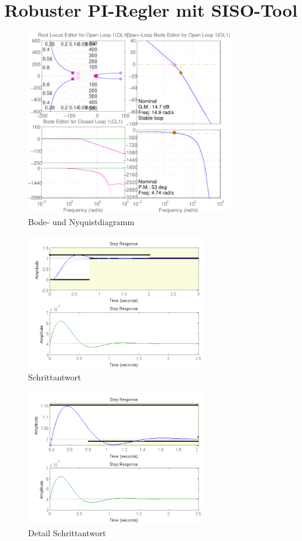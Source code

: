 \section{Robuster PI-Regler mit SISO-Tool}
\begin{figure}[h!]
    \centering
    \includegraphics[width=0.8\textwidth]{10/diag_siso_pi.pdf}
    \caption{Bode- und Nyquistdiagramm}
    \label{fig:07a}
\end{figure}
\begin{figure}[h!]
    \centering
    \includegraphics[width=0.7\textwidth]{10/step_siso_pi.pdf}
    \caption{Schrittantwort}
    \label{fig:07b}
\end{figure}
\begin{figure}[h!]
    \centering
    \includegraphics[width=0.7\textwidth]{10/step_detail_siso_pi.pdf}
    \caption{Detail Schrittantwort}
    \label{fig:07c}
\end{figure}
